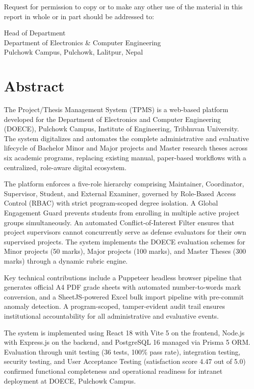 \documentclass[12pt,a4paper]{report}
\begin{document}
Request for permission to copy or to make any other use of the material in this report in whole or in part should be addressed to:

\vspace{0.4cm}
\noindent
Head of Department\\
Department of Electronics \& Computer Engineering\\
Pulchowk Campus, Pulchowk, Lalitpur, Nepal

\chapter*{Abstract}

The Project/Thesis Management System (TPMS) is a web-based platform developed for the Department of Electronics and Computer Engineering (DOECE), Pulchowk Campus, Institute of Engineering, Tribhuvan University. The system digitalizes and automates the complete administrative and evaluative lifecycle of Bachelor Minor and Major projects and Master research theses across six academic programs, replacing existing manual, paper-based workflows with a centralized, role-aware digital ecosystem.

The platform enforces a five-role hierarchy comprising Maintainer, Coordinator, Supervisor, Student, and External Examiner, governed by Role-Based Access Control (RBAC) with strict program-scoped degree isolation. A Global Engagement Guard prevents students from enrolling in multiple active project groups simultaneously. An automated Conflict-of-Interest Filter ensures that project supervisors cannot concurrently serve as defense evaluators for their own supervised projects. The system implements the DOECE evaluation schemes for Minor projects (50 marks), Major projects (100 marks), and Master Theses (300 marks) through a dynamic rubric engine.

Key technical contributions include a Puppeteer headless browser pipeline that generates official A4 PDF grade sheets with automated number-to-words mark conversion, and a SheetJS-powered Excel bulk import pipeline with pre-commit anomaly detection. A program-scoped, tamper-evident audit trail ensures institutional accountability for all administrative and evaluative events.

The system is implemented using React 18 with Vite 5 on the frontend, Node.js with Express.js on the backend, and PostgreSQL 16 managed via Prisma 5 ORM. Evaluation through unit testing (36 tests, 100\% pass rate), integration testing, security testing, and User Acceptance Testing (satisfaction score 4.47 out of 5.0) confirmed functional completeness and operational readiness for intranet deployment at DOECE, Pulchowk Campus.
\end{document}

